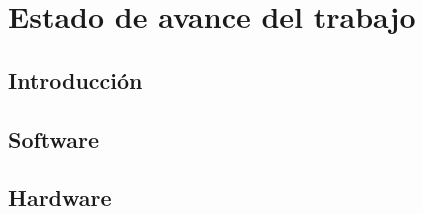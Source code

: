 
\chapter{Estado de avance del trabajo}
\section{Introducción}

\section{Software}

\section{Hardware}